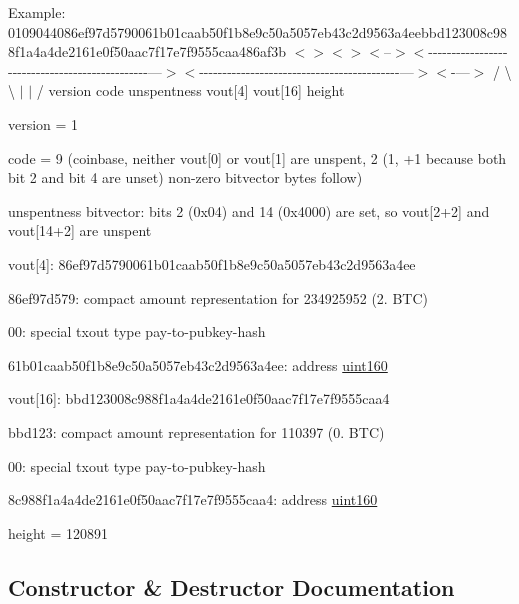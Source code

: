 Example\+: 0109044086ef97d5790061b01caab50f1b8e9c50a5057eb43c2d9563a4eebbd123008c988f1a4a4de2161e0f50aac7f17e7f9555caa486af3b $<$$>$$<$$>$$<$--$>$$<$-\/-\/-\/-\/-\/-\/-\/-\/-\/-\/-\/-\/-\/-\/-\/-\/-\/-\/-\/-\/-\/-\/-\/-\/-\/-\/-\/-\/-\/-\/-\/-\/-\/-\/-\/-\/-\/-\/-\/-\/-\/-\/-\/-\/-\/-\/-\/---$>$$<$-\/-\/-\/-\/-\/-\/-\/-\/-\/-\/-\/-\/-\/-\/-\/-\/-\/-\/-\/-\/-\/-\/-\/-\/-\/-\/-\/-\/-\/-\/-\/-\/-\/-\/-\/-\/-\/-\/-\/-\/-\/-\/-\/---$>$$<$-\/---$>$ / \textbackslash{} \textbackslash{} $\vert$ $\vert$ / version code unspentness vout\mbox{[}4\mbox{]} vout\mbox{[}16\mbox{]} height


\begin{DoxyItemize}
\item version = 1
\item code = 9 (coinbase, neither vout\mbox{[}0\mbox{]} or vout\mbox{[}1\mbox{]} are unspent, 2 (1, +1 because both bit 2 and bit 4 are unset) non-\/zero bitvector bytes follow)
\item unspentness bitvector\+: bits 2 (0x04) and 14 (0x4000) are set, so vout\mbox{[}2+2\mbox{]} and vout\mbox{[}14+2\mbox{]} are unspent
\item vout\mbox{[}4\mbox{]}\+: 86ef97d5790061b01caab50f1b8e9c50a5057eb43c2d9563a4ee
\begin{DoxyItemize}
\item 86ef97d579\+: compact amount representation for 234925952 (2. B\+T\+C)
\item 00\+: special txout type pay-\/to-\/pubkey-\/hash
\item 61b01caab50f1b8e9c50a5057eb43c2d9563a4ee\+: address \hyperlink{classuint160}{uint160}
\end{DoxyItemize}
\item vout\mbox{[}16\mbox{]}\+: bbd123008c988f1a4a4de2161e0f50aac7f17e7f9555caa4
\begin{DoxyItemize}
\item bbd123\+: compact amount representation for 110397 (0. B\+T\+C)
\item 00\+: special txout type pay-\/to-\/pubkey-\/hash
\item 8c988f1a4a4de2161e0f50aac7f17e7f9555caa4\+: address \hyperlink{classuint160}{uint160}
\end{DoxyItemize}
\item height = 120891 
\end{DoxyItemize}

\subsection{Constructor \& Destructor Documentation}
\hypertarget{class_c_coins_a303f3b245c339c11a1ea4318b01ec290}{}
